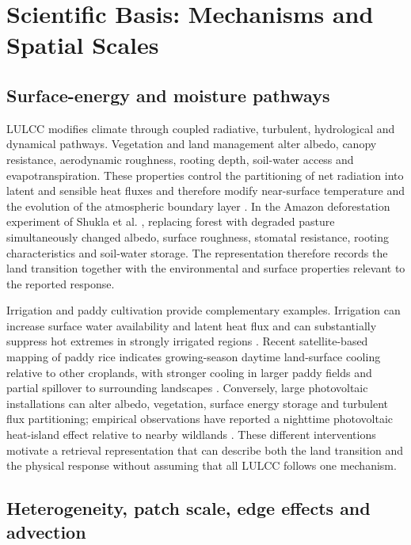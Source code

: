 \documentclass[10pt,twocolumn]{article}
\begin{document}
\section{Scientific Basis: Mechanisms and Spatial Scales}

\subsection{Surface-energy and moisture pathways}

LULCC modifies climate through coupled radiative, turbulent, hydrological and dynamical pathways. Vegetation and land management alter albedo, canopy resistance, aerodynamic roughness, rooting depth, soil-water access and evapotranspiration. These properties control the partitioning of net radiation into latent and sensible heat fluxes and therefore modify near-surface temperature and the evolution of the atmospheric boundary layer \cite{spracklen2018}. In the Amazon deforestation experiment of Shukla et al. \cite{shukla1990}, replacing forest with degraded pasture simultaneously changed albedo, surface roughness, stomatal resistance, rooting characteristics and soil-water storage. The representation therefore records the land transition together with the environmental and surface properties relevant to the reported response.

Irrigation and paddy cultivation provide complementary examples. Irrigation can increase surface water availability and latent heat flux and can substantially suppress hot extremes in strongly irrigated regions \cite{thiery2020}. Recent satellite-based mapping of paddy rice indicates growing-season daytime land-surface cooling relative to other croplands, with stronger cooling in larger paddy fields and partial spillover to surrounding landscapes \cite{weng2025}. Conversely, large photovoltaic installations can alter albedo, vegetation, surface energy storage and turbulent flux partitioning; empirical observations have reported a nighttime photovoltaic heat-island effect relative to nearby wildlands \cite{barrongafford2016}. These different interventions motivate a retrieval representation that can describe both the land transition and the physical response without assuming that all LULCC follows one mechanism.

\subsection{Heterogeneity, patch scale, edge effects and advection}
\end{document}
